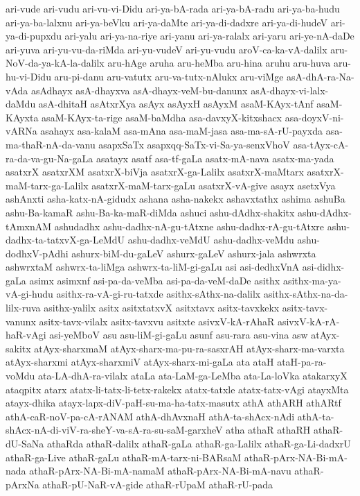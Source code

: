 {ari-vude
ari-vudu
ari-vu-vi-Didu
ari-ya-bA-rada
ari-ya-bA-radu
ari-ya-ba-hudu
ari-ya-ba-lalxnu
ari-ya-beVku
ari-ya-daMte
ari-ya-di-dadxre
ari-ya-di-hudeV
ari-ya-di-pupxdu
ari-yalu
ari-ya-na-riye
ari-yanu
ari-ya-ralalx
ari-yaru
ari-ye-nA-daDe
ari-yuva
ari-yu-vu-da-riMda
ari-yu-vudeV
ari-yu-vudu
aroV-ca-ka-vA-dalilx
aru-NoV-da-ya-kA-la-dalilx
aru-hAge
aruha
aru-heMba
aru-hina
aruhu
aru-huva
aru-hu-vi-Didu
aru-pi-danu
aru-vatutx
aru-va-tutx-nAlukx
aru-viMge
asA-dhA-ra-Na-vAda
asAdhayx
asA-dhayxva
asA-dhayx-veM-bu-danunx
asA-dhayx-vi-lalx-daMdu
asA-dhitaH
asAtxrXya
asAyx
asAyxH
asAyxM
asaM-KAyx-tAnf
asaM-KAyxta
asaM-KAyx-ta-rige
asaM-baMdha
asa-davxyX-kitxshacx
asa-doyxV-ni-vARNa
asahayx
asa-kalaM
asa-mAna
asa-maM-jasa
asa-ma-sA-rU-payxda
asa-ma-thaR-nA-da-vanu
asapxSaTx
asapxqq-SaTx-vi-Sa-ya-senxVhoV
asa-tAyx-cA-ra-da-va-gu-Na-gaLa
asatayx
asatf
asa-tf-gaLa
asatx-mA-nava
asatx-ma-yada
asatxrX
asatxrXM
asatxrX-biVja
asatxrX-ga-Lalilx
asatxrX-maMtarx
asatxrX-maM-tarx-ga-Lalilx
asatxrX-maM-tarx-gaLu
asatxrX-vA-give
asayx
asetxVya
ashAnxti
asha-katx-nA-gidudx
ashana
asha-nakekx
ashavxtathx
ashima
ashuBa
ashu-Ba-kamaR
ashu-Ba-ka-maR-diMda
ashuci
ashu-dAdhx-shakitx
ashu-dAdhx-tAmxnAM
ashudadhx
ashu-dadhx-nA-gu-tAtxne
ashu-dadhx-rA-gu-tAtxre
ashu-dadhx-ta-tatxvX-ga-LeMdU
ashu-dadhx-veMdU
ashu-dadhx-veMdu
ashu-dodhxV-pAdhi
ashurx-biM-du-gaLeV
ashurx-gaLeV
ashurx-jala
ashwrxta
ashwrxtaM
ashwrx-ta-liMga
ashwrx-ta-liM-gi-gaLu
asi
asi-dedhxVnA
asi-didhx-gaLa
asimx
asimxnf
asi-pa-da-veMba
asi-pa-da-veM-daDe
asithx
asithx-ma-ya-vA-gi-hudu
asithx-ra-vA-gi-ru-tatxde
asithx-sAthx-na-dalilx
asithx-sAthx-na-da-lilx-ruva
asithx-yalilx
asitx
asitxtatxvX
asitxtavx
asitx-tavxkekx
asitx-tavx-vanunx
asitx-tavx-vilalx
asitx-tavxvu
asitxte
asivxV-kA-rAhaR
asivxV-kA-rA-haR-vAgi
asi-yeMboV
asu
asu-liM-gi-gaLu
asunf
asu-rara
asu-vina
asw
atAyx-sakitx
atAyx-sharxmaM
atAyx-sharx-ma-pu-ra-sasxrAH
atAyx-sharx-ma-varxta
atAyx-sharxmi
atAyx-sharxmiV
atAyx-sharx-mi-gaLa
ata
ataH
ataH-pa-ra-voMdu
ata-LA-dhA-ra-vilalx
ataLa
ata-LaM-ga-LeMba
ata-La-loVka
atakarxyX
ataqpitx
atarx
atatx-li-tatx-li-tetx-rakekx
atatx-tatxle
atatx-tatx-vAgi
atayxMta
atayx-dhika
atayx-lapx-diV-paH-su-ma-ha-tatx-masutx
athA
athARH
athARtf
athA-caR-noV-pa-cA-rANAM
athA-dhAvxnaH
athA-ta-shAcx-nAdi
athA-ta-shAcx-nA-di-viV-ra-sheY-va-sA-ra-su-saM-garxheV
atha
athaR
athaRH
athaR-dU-SaNa
athaRda
athaR-dalilx
athaR-gaLa
athaR-ga-Lalilx
athaR-ga-Li-dadxrU
athaR-ga-Live
athaR-gaLu
athaR-mA-tarx-ni-BARsaM
athaR-pArx-NA-Bi-mA-nada
athaR-pArx-NA-Bi-mA-namaM
athaR-pArx-NA-Bi-mA-navu
athaR-pArxNa
athaR-pU-NaR-vA-gide
athaR-rUpaM
athaR-rU-pada
}
